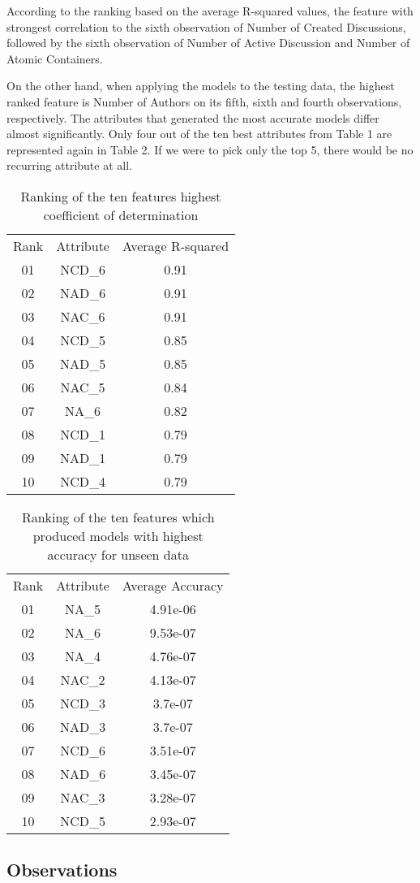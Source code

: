 \documentclass[11pt]{article}
\begin{document}
According to the ranking based on the average R-squared values, the feature with strongest correlation to the sixth observation of Number of Created Discussions, followed by the sixth observation of Number of Active Discussion and Number of Atomic Containers.

On the other hand, when applying the models to the testing data, the highest ranked feature is Number of Authors on its fifth, sixth and fourth observations, respectively. The attributes that generated the most accurate models differ almost significantly. Only four out of the ten best attributes from Table 1 are represented again in Table 2. If we were to pick only the top 5, there would be no recurring attribute at all.
\begin{table}[h!]
\centering
\normalsize\begin{tabulary}{1.0\textwidth}{CCC}
Rank & Attribute & Average R-squared \\
01 & NCD\_6 & 0.91 \\
02 & NAD\_6 & 0.91 \\
03 & NAC\_6 & 0.91 \\
04 & NCD\_5 & 0.85 \\
05 & NAD\_5 & 0.85 \\
06 & NAC\_5 & 0.84 \\
07 & NA\_6 & 0.82 \\
08 & NCD\_1 & 0.79 \\
09 & NAD\_1 & 0.79 \\
10 & NCD\_4 & 0.79 \\
\end{tabulary}
\caption{{Ranking of the ten features highest coefficient of determination
{\label{448570}}%
}}
\end{table}
\begin{table}[h!]
\centering
\normalsize\begin{tabulary}{1.0\textwidth}{CCC}
Rank & Attribute & Average Accuracy \\
01 & NA\_5 & 4.91e-06 \\
02 & NA\_6 & 9.53e-07 \\
03 & NA\_4 & 4.76e-07 \\
04 & NAC\_2 & 4.13e-07 \\
05 & NCD\_3 & 3.7e-07 \\
06 & NAD\_3 & 3.7e-07 \\
07 & NCD\_6 & 3.51e-07 \\
08 & NAD\_6 & 3.45e-07 \\
09 & NAC\_3 & 3.28e-07 \\
10 & NCD\_5 & 2.93e-07 \\
\end{tabulary}
\caption{{Ranking of the ten features which produced models with highest accuracy
for unseen data
{\label{987099}}%
}}
\end{table}\subsection {Observations}
\end{document}
